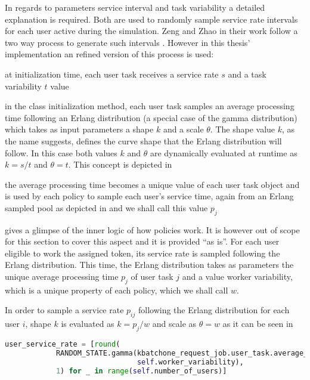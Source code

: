 \documentclass{seal_thesis}
\begin{document}
In regards to parameters service interval and task variability a detailed explanation is required. Both are used to randomly sample service rate intervals for each user active during the simulation. Zeng and Zhao in their work follow a two way process to generate such intervals \cite[p. 8]{Zeng2005}. However in this thesis' implementation an refined version of this process is used:
\begin{enumerate*}
	\item at initialization time, each user task receives a service rate $s$ and a task variability $t$ value
	\item in the class initialization method, each user task samples an average processing time following an Erlang distribution (a special case of the gamma distribution) which takes as input parameters a shape $k$ and a scale $\theta$. The shape value $k$, as the name suggests, defines the curve shape that the Erlang distribution will follow. In this case both values $k$ and $\theta$ are dynamically evaluated at runtime as $k=s/t$ and $\theta = t$. This concept is depicted in 
	\item the average processing time becomes a unique value of each user task object and is used by each policy to sample each user's service time, again from an Erlang sampled pool as depicted in  and we shall call this value $p_j$
\end{enumerate*}

 gives a glimpse of the inner logic of how policies work. It is however out of scope for this section to cover this aspect and it is provided ``as is''. For each user eligible to work the assigned token, its service rate is sampled following the Erlang distribution. This time, the Erlang distribution takes as parameters the unique average processing time $p_j$ of user task $j$ and a value worker variability, which is a unique property of each policy, which we shall call $w$.

In order to sample a service rate $p_{ij}$ following the Erlang distribution for each user $i$, shape $k$ is evaluated as $k=p_j/w$ and scale as $\theta = w$ as it can be seen in  

	

\begin{lstlisting}[caption=User service rate sampling following an Erlang distribution,label=lst:user_service_rate,language=Python]
    user_service_rate = [round(
            RANDOM_STATE.gamma(kbatchone_request_job.user_task.average_processing_time / self.worker_variability,
                               self.worker_variability),
            1) for _ in range(self.number_of_users)]
\end{lstlisting}
\end{document}
